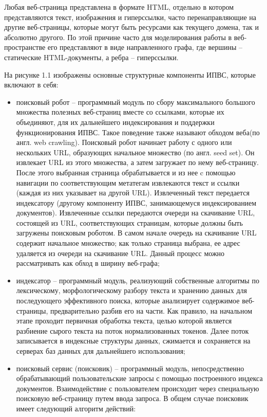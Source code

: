 Любая веб-страница представлена в формате HTML, отдельно в котором представляются текст, изображения и гиперссылки, часто перенаправляющие на другие веб-страницы, которые могут быть ресурсами как текущего домена, так и абсолютно другого. По этой причине часто для моделирования работы в веб-пространстве его представляют в виде направленного графа, где вершины -- статические HTML-документы, а ребра -- гиперссылки.

На рисунке 1.1 изображены основные структурные компоненты ИПВС, которые включают в себя:
\begin{itemize}
\item поисковый робот -- программный модуль по сбору максимального большого множества полезных веб-страниц вместе со ссылками, которые их объединяют, для их дальнейшего индексирования и поддержки функционирования ИПВС. Такое поведение также называют обходом веба(по англ. web crawling). Поисковый робот начинает работу с одного или нескольких URL, образующих начальное множество (по англ. seed set). Он извлекает URL из этого множества, а затем загружает по нему веб-страницу. После этого выбранная страница обрабатывается и из нее c помощью навигации по соответствующим метатегам извлекаются текст и ссылки  (каждая из них указывает на другой URL). Извлеченный текст передается индексатору (другому компоненту ИПВС, занимающемуся индексированием документов). Извлеченные ссылки передаются очереди на скачивание URL, состоящей из URL, соответствующих страницам, которые должны быть загружены поисковым роботом. В самом начале очередь на скачивание URL содержит начальное множество; как только страница выбрана, ее адрес удаляется из очереди на скачивание URL. Данный процесс можно рассматривать как обход в ширину веб-графа;
\item индексатор -- программный модуль, реализующий собственные алгоритмы по лексическому, морфологическому разбору текста и хранению данных для последующего эффективного поиска, которые анализирует содержимое веб-страницы, предварительно разбив его на части. Как правило, на начальном этапе проходит первичная обработка текста, целью которой является разбиение сырого текста на поток нормализованных токенов. Далее поток записывается в индексные структуры данных, сжимается и сохраняется на серверах баз данных для дальнейшего использования;
\item поисковый сервис (поисковик) -- программный модуль, непосредственно обрабатывающий пользовательские запросы с помощью построенного индекса документов. Взаимодействие с пользователем происходит через специальную поисковую веб-страницу путем ввода запроса. В общем случае поисковик имеет следующий алгоритм действий:

\end{itemize}
